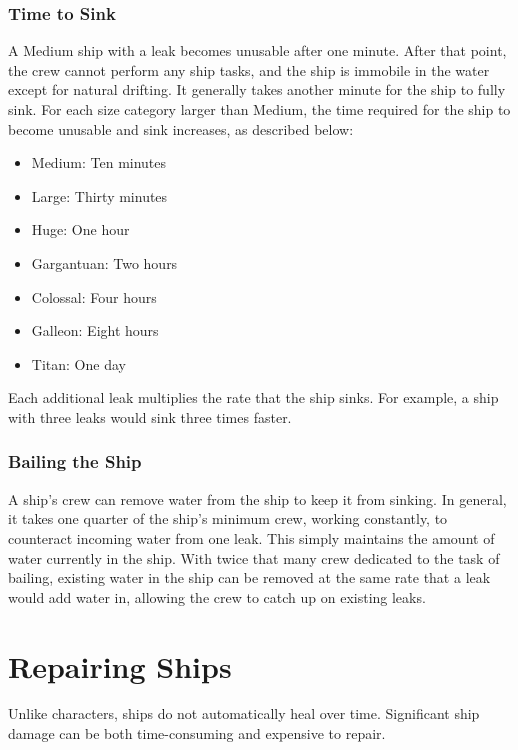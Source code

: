         \subsubsection{Time to Sink}
            A Medium ship with a leak becomes unusable after one minute.
            After that point, the crew cannot perform any ship tasks, and the ship is immobile in the water except for natural drifting.
            It generally takes another minute for the ship to fully sink.
            For each size category larger than Medium, the time required for the ship to become unusable and sink increases, as described below:
            \begin{itemize}
                \item Medium: Ten minutes
                \item Large: Thirty minutes
                \item Huge: One hour
                \item Gargantuan: Two hours
                \item Colossal: Four hours
                \item Galleon: Eight hours
                \item Titan: One day
            \end{itemize}

            Each additional leak multiplies the rate that the ship sinks.
            For example, a ship with three leaks would sink three times faster.

        \subsubsection{Bailing the Ship}
            A ship's crew can remove water from the ship to keep it from sinking.
            In general, it takes one quarter of the ship's minimum crew, working constantly, to counteract incoming water from one leak.
            This simply maintains the amount of water currently in the ship.
            With twice that many crew dedicated to the task of bailing, existing water in the ship can be removed at the same rate that a leak would add water in, allowing the crew to catch up on existing leaks.

\section{Repairing Ships}
    Unlike characters, ships do not automatically heal over time.
    Significant ship damage can be both time-consuming and expensive to repair.

